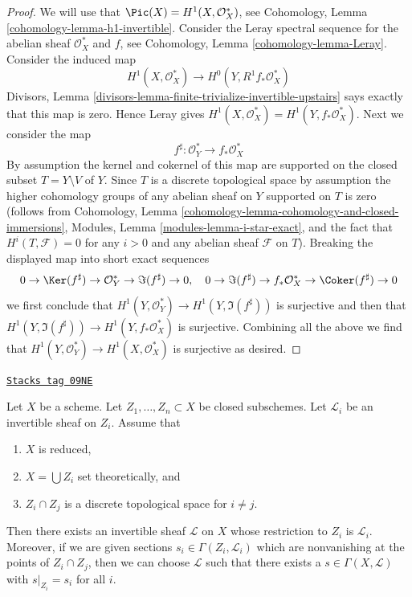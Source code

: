 \begin{proof}
We will use that $\Pic(X) = H^1(X, \mathcal{O}_X^*)$, see
Cohomology, Lemma \ref{cohomology-lemma-h1-invertible}.
Consider the Leray spectral sequence for the abelian sheaf $\mathcal{O}_X^*$
and $f$, see Cohomology, Lemma \ref{cohomology-lemma-Leray}.
Consider the induced map
$$
H^1(X, \mathcal{O}_X^*) \longrightarrow H^0(Y, R^1f_*\mathcal{O}_X^*)
$$
Divisors, Lemma \ref{divisors-lemma-finite-trivialize-invertible-upstairs}
says exactly that this map is zero. Hence Leray gives
$H^1(X, \mathcal{O}_X^*) = H^1(Y, f_*\mathcal{O}_X^*)$.
Next we consider the map
$$
f^\sharp : \mathcal{O}_Y^* \longrightarrow f_*\mathcal{O}_X^*
$$
By assumption the kernel and cokernel of this map are supported
on the closed subset $T = Y \setminus V$ of $Y$.
Since $T$ is a discrete topological space by assumption
the higher cohomology groups of any abelian sheaf on $Y$ supported
on $T$ is zero (follows from
Cohomology, Lemma \ref{cohomology-lemma-cohomology-and-closed-immersions},
Modules, Lemma \ref{modules-lemma-i-star-exact}, and
the fact that $H^i(T, \mathcal{F}) = 0$ for any $i > 0$
and any abelian sheaf $\mathcal{F}$ on $T$).
Breaking the displayed map into short exact sequences
$$
0 \to \Ker(f^\sharp) \to \mathcal{O}_Y^* \to \Im(f^\sharp) \to 0,\quad
0 \to \Im(f^\sharp) \to f_*\mathcal{O}_X^* \to \Coker(f^\sharp) \to 0
$$
we first conclude that $H^1(Y, \mathcal{O}_Y^*) \to H^1(Y, \Im(f^\sharp))$
is surjective and then that
$H^1(Y, \Im(f^\sharp)) \to H^1(Y, f_*\mathcal{O}_X^*)$ is surjective.
Combining all the above we find that $H^1(Y, \mathcal{O}_Y^*) \to
H^1(X, \mathcal{O}_X^*)$ is surjective as desired.
\end{proof}

\begin{lemma}
\label{varieties-lemma-glue-invertible-sheaves}
\href{https://stacks.math.columbia.edu/tag/09NE}{\texttt{Stacks tag 09NE}}

Let $X$ be a scheme. Let $Z_1, \ldots, Z_n \subset X$ be closed
subschemes. Let $\mathcal{L}_i$ be an invertible sheaf on $Z_i$.
Assume that
\begin{enumerate}
\item $X$ is reduced,
\item $X = \bigcup Z_i$ set theoretically, and
\item $Z_i \cap Z_j$ is a discrete topological space for $i \not = j$.
\end{enumerate}
Then there exists an invertible sheaf $\mathcal{L}$ on $X$ whose restriction
to $Z_i$ is $\mathcal{L}_i$. Moreover, if we are given sections
$s_i \in \Gamma(Z_i, \mathcal{L}_i)$ which are nonvanishing at the
points of $Z_i \cap Z_j$, then we can choose $\mathcal{L}$ such
that there exists a $s \in \Gamma(X, \mathcal{L})$ with
$s|_{Z_i} = s_i$ for all $i$.
\end{lemma}

